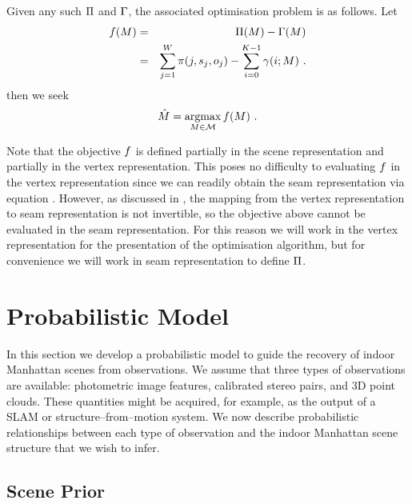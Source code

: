 Given any such $\ScenePayoff$ and $\ScenePenalty$, the associated
optimisation problem is as follows. Let
\begin{eqnarray}
  \label{eq:scene-objective}
  \Objective(\Scene) &=&
  \ScenePayoff(\Scene) - \ScenePenalty(\Scene)\\
  &=&
  \sum_{j=1}^{\Width} \PixelPayoff(j,\seam_j,\WallOrient_j) -
  \sum_{i=0}^{\NumWalls-1} \CornerPenalty(i;\Scene) ~.
\end{eqnarray}
then we seek
\begin{equation}
  \label{eq:opt-scene}
  \EstimatedScene = \argmax_{\Scene\in\SetOfScenes}\limits \Objective(\Scene) ~.
\end{equation}

Note that the objective $\Objective$ is defined partially in the scene
representation and partially in the vertex representation. This poses
no difficulty to evaluating $\Objective$ in the vertex representation
since we can readily obtain the seam representation via equation
. However, as discussed in
, the mapping from the vertex
representation to seam representation is not invertible, so the
objective above cannot be evaluated in the seam representation. For
this reason we will work in the vertex representation for the
presentation of the optimisation algorithm, but for convenience we
will work in seam representation to define  $\ScenePayoff$.

\section{Probabilistic Model}

In this section we develop a probabilistic model to guide the
recovery of indoor Manhattan scenes from observations. We assume
that three types of observations are available: photometric image
features, calibrated stereo pairs, and 3D point clouds. These
quantities might be acquired, for example, as the output of a SLAM or
structure--from--motion system. We now describe
probabilistic relationships between each type of observation and the
indoor Manhattan scene structure that we wish to infer.

\subsection{Scene Prior}

